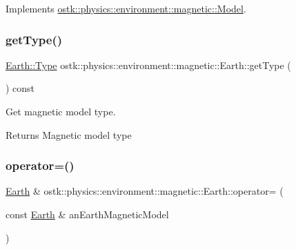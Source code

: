 Implements \hyperlink{classostk_1_1physics_1_1environment_1_1magnetic_1_1_model_abf0510f9be2c196ea3c0586d02979b0f}{ostk\+::physics\+::environment\+::magnetic\+::\+Model}.

\mbox{\label{classostk_1_1physics_1_1environment_1_1magnetic_1_1_earth_a20952c06c726e4f89f2f8184653ea74e}} 
\subsubsection{\texorpdfstring{get\+Type()}{getType()}}
{\footnotesize\ttfamily \hyperlink{classostk_1_1physics_1_1environment_1_1magnetic_1_1_earth_a30a064d87b6fce338e76aebd3043b6b6}{Earth\+::\+Type} ostk\+::physics\+::environment\+::magnetic\+::\+Earth\+::get\+Type (\begin{DoxyParamCaption}{ }\end{DoxyParamCaption}) const}



Get magnetic model type. 

\begin{DoxyReturn}{Returns}
Magnetic model type 
\end{DoxyReturn}
\mbox{\label{classostk_1_1physics_1_1environment_1_1magnetic_1_1_earth_ad7ce781762b59980fb255b3b2a3f6aca}} 
\subsubsection{\texorpdfstring{operator=()}{operator=()}}
{\footnotesize\ttfamily \hyperlink{classostk_1_1physics_1_1environment_1_1magnetic_1_1_earth}{Earth} \& ostk\+::physics\+::environment\+::magnetic\+::\+Earth\+::operator= (\begin{DoxyParamCaption}\item[{const \hyperlink{classostk_1_1physics_1_1environment_1_1magnetic_1_1_earth}{Earth} \&}]{an\+Earth\+Magnetic\+Model }\end{DoxyParamCaption})}



